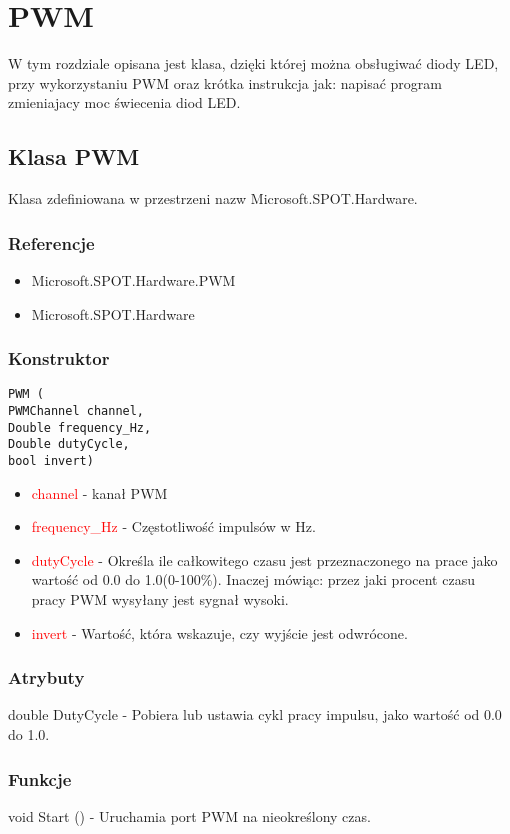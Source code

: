 \documentclass{article}
\begin{document}
\section{PWM}
W tym rozdziale opisana jest klasa, dzięki której można obsługiwać diody LED, przy wykorzystaniu PWM oraz krótka instrukcja jak: napisać program zmieniajacy moc świecenia diod LED.
\subsection{Klasa PWM}
Klasa zdefiniowana w przestrzeni nazw Microsoft.SPOT.Hardware. 
\subsubsection{Referencje}
\begin{itemize}
\item Microsoft.SPOT.Hardware.PWM
\item Microsoft.SPOT.Hardware
\end{itemize}
\subsubsection{Konstruktor}
\begin{lstlisting}[frame=single] 
PWM (
PWMChannel channel,
Double frequency_Hz, 
Double dutyCycle,  
bool invert)
\end{lstlisting}
\begin{itemize}
\item \textcolor{red}{channel} - kanał PWM
\item \textcolor{red}{frequency\_Hz} - Częstotliwość impulsów w Hz.
\item \textcolor{red}{dutyCycle} - Określa ile całkowitego czasu jest przeznaczonego na prace jako wartość od 0.0 do 1.0(0-100\%). Inaczej mówiąc: przez jaki procent czasu pracy PWM wysyłany jest sygnał wysoki.
\item \textcolor{red}{invert} - Wartość, która wskazuje, czy wyjście jest odwrócone.
\end{itemize}
\subsubsection{Atrybuty}
double DutyCycle - Pobiera lub ustawia cykl pracy impulsu, jako wartość od 0.0 do 1.0.
\subsubsection{Funkcje}
void Start () - Uruchamia port PWM na nieokreślony czas.
\end{document}
